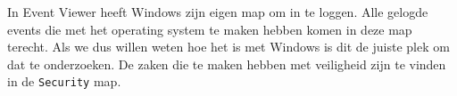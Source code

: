In Event Viewer heeft Windows zijn eigen map om in te loggen. Alle gelogde events die met het operating system te maken hebben komen in deze map terecht. Als we dus willen weten hoe het is met Windows is dit de juiste plek om dat te onderzoeken. De zaken die te maken hebben met veiligheid zijn te vinden in de \texttt{Security} map.

